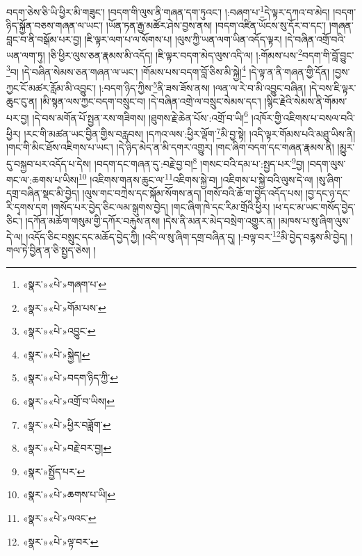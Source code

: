 བདག་ཅེས་ཅི་ཡི་ཕྱིར་མི་གཟུང་། །བདག་གི་ལུས་ནི་གཞན་དག་ཏུའང་། །:བཞག་པ་\footnote{«སྣར་»«པེ་»གཞག་པ་}དེ་ལྟར་དཀའ་བ་མེད། །བདག་ཉིད་སྐྱོན་བཅས་གཞན་ལ་ཡང་། །ཡོན་ཏན་རྒྱ་མཚོར་ཤེས་བྱས་ནས། །བདག་འཛིན་ཡོངས་སུ་དོར་བ་དང་། །གཞན་བླང་བ་ནི་བསྒོམ་པར་བྱ། །ཇི་ལྟར་ལག་པ་ལ་སོགས་པ། །ལུས་ཀྱི་ཡན་ལག་ཡིན་འདོད་ལྟར། །དེ་བཞིན་འགྲོ་བའི་ཡན་ལག་ཏུ། །ཅི་ཕྱིར་ལུས་ཅན་རྣམས་མི་འདོད། །ཇི་ལྟར་བདག་མེད་ལུས་འདི་ལ། །:གོམས་པས་\footnote{«སྣར་»«པེ་»གོམ་པས་}བདག་གི་བློ་བྱུང་\footnote{«སྣར་»«པེ་»འབྱུང་}བ། །དེ་བཞིན་སེམས་ཅན་གཞན་ལ་ཡང་། །གོམས་པས་བདག་བློ་ཅིས་མི་སྐྱེ།\footnote{«སྣར་»«པེ་»སྐྱེད།} །དེ་ལྟ་ན་ནི་གཞན་གྱི་དོན། །བྱས་ཀྱང་ངོ་མཚར་རློམ་མི་འབྱུང་། །:བདག་ཉིད་ཀྱིས་\footnote{«སྣར་»«པེ་»བདག་ཉིད་ཀྱི་}ནི་ཟས་ཟོས་ནས། །ལན་ལ་རེ་བ་མི་འབྱུང་བཞིན། །དེ་བས་ཇི་ལྟར་ཆུང་ངུ་ན། །མི་སྙན་ལས་ཀྱང་བདག་བསྲུང་བ། །དེ་བཞིན་འགྲེ་ལ་བསྲུང་སེམས་དང་། །སྙིང་རྗེའི་སེམས་ནི་གོམས་པར་བྱ། །དེ་བས་མགོན་པོ་སྤྱན་རས་གཟིགས། །ཐུགས་རྗེ་ཆེན་པོས་:འགྲོ་བ་ཡི།\footnote{«སྣར་»«པེ་»འགྲོ་བ་ཡིས།} །འཁོར་གྱི་འཇིགས་པ་བསལ་བའི་ཕྱིར། །རང་གི་མཚན་ཡང་བྱིན་གྱིས་བརླབས། །དཀའ་ལས་:ཕྱིར་ལྡོག་\footnote{«སྣར་»«པེ་»ཕྱིར་བཟློག་}མི་བྱ་སྟེ། །འདི་ལྟར་གོམས་པའི་མཐུ་ཡིས་ནི། །གང་གི་མིང་ཐོས་འཇིགས་པ་ཡང་། །དེ་ཉིད་མེད་ན་མི་དགར་འགྱུར། །གང་ཞིག་བདག་དང་གཞན་རྣམས་ནི། །མྱུར་དུ་བསྐྱབ་པར་འདོད་པ་དེས། །བདག་དང་གཞན་དུ་:བརྗེ་བྱ་བ།\footnote{«སྣར་»«པེ་»བརྗེ་བར་བྱ།} །གསང་བའི་དམ་པ་:སྤྱད་པར་\footnote{«སྣར་»སྤྱོད་པར་}བྱ། །བདག་ལུས་གང་ལ་:ཆགས་པ་ཡིས།\footnote{«སྣར་»«པེ་»ཆགས་པ་ཡི།} །འཇིགས་གནས་ཆུང་ལ་\footnote{«སྣར་»«པེ་»ལའང་}འཇིགས་སྐྱེ་བ། །འཇིགས་པ་སྐྱེ་བའི་ལུས་དེ་ལ། །སུ་ཞིག་དགྲ་བཞིན་སྡང་མི་བྱེད། །ལུས་གང་བཀྲེས་དང་སྐོམ་སོགས་ནད། །གསོ་བའི་ཆོ་ག་བྱེད་འདོད་པས། །བྱ་དང་ཉ་དང་རི་དྭགས་དག །གསོད་པར་བྱེད་ཅིང་ལམ་སྒུགས་བྱེད། །གང་ཞིག་ཁེ་དང་རིམ་གྲོའི་ཕྱིར། །ཕ་དང་མ་ཡང་གསོད་བྱེད་ཅིང་། །དཀོན་མཆོག་གསུམ་གྱི་དཀོར་བརྐུས་ནས། །དེས་ནི་མནར་མེད་བསྲེག་འགྱུར་ན། །མཁས་པ་སུ་ཞིག་ལུས་དེ་ལ། །འདོད་ཅིང་བསྲུང་དང་མཆོད་བྱེད་ཀྱི། །འདི་ལ་སུ་ཞིག་དགྲ་བཞིན་དུ། །:བལྟ་བར་\footnote{«སྣར་»«པེ་»ལྟ་བར་}མི་བྱེད་བརྙས་མི་བྱེད། །གལ་ཏེ་བྱིན་ན་ཅི་སྤྱད་ཅེས། །
